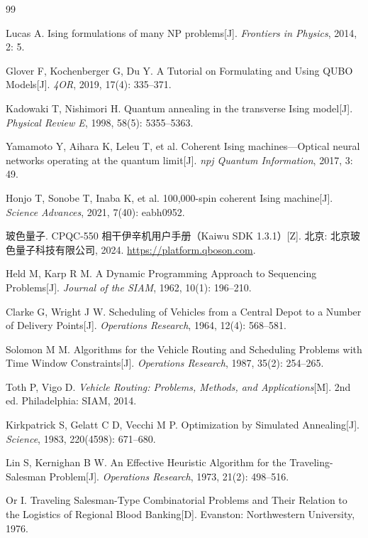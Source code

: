 \documentclass[UTF8,12pt,a4paper]{ctexart}
\begin{document}
\begin{thebibliography}{99}

Lucas A. Ising formulations of many NP problems[J]. \emph{Frontiers in Physics}, 2014, 2: 5.

Glover F, Kochenberger G, Du Y. A Tutorial on Formulating and Using QUBO Models[J]. \emph{4OR}, 2019, 17(4): 335--371.

Kadowaki T, Nishimori H. Quantum annealing in the transverse Ising model[J]. \emph{Physical Review E}, 1998, 58(5): 5355--5363.

Yamamoto Y, Aihara K, Leleu T, et al. Coherent Ising machines---Optical neural networks operating at the quantum limit[J]. \emph{npj Quantum Information}, 2017, 3: 49.

Honjo T, Sonobe T, Inaba K, et al. 100,000-spin coherent Ising machine[J]. \emph{Science Advances}, 2021, 7(40): eabh0952.

玻色量子. CPQC-550 相干伊辛机用户手册（Kaiwu SDK 1.3.1）[Z]. 北京: 北京玻色量子科技有限公司, 2024. \url{https://platform.qboson.com}.

Held M, Karp R M. A Dynamic Programming Approach to Sequencing Problems[J]. \emph{Journal of the SIAM}, 1962, 10(1): 196--210.

Clarke G, Wright J W. Scheduling of Vehicles from a Central Depot to a Number of Delivery Points[J]. \emph{Operations Research}, 1964, 12(4): 568--581.

Solomon M M. Algorithms for the Vehicle Routing and Scheduling Problems with Time Window Constraints[J]. \emph{Operations Research}, 1987, 35(2): 254--265.

Toth P, Vigo D. \emph{Vehicle Routing: Problems, Methods, and Applications}[M]. 2nd ed. Philadelphia: SIAM, 2014.

Kirkpatrick S, Gelatt C D, Vecchi M P. Optimization by Simulated Annealing[J]. \emph{Science}, 1983, 220(4598): 671--680.

Lin S, Kernighan B W. An Effective Heuristic Algorithm for the Traveling-Salesman Problem[J]. \emph{Operations Research}, 1973, 21(2): 498--516.

Or I. Traveling Salesman-Type Combinatorial Problems and Their Relation to the Logistics of Regional Blood Banking[D]. Evanston: Northwestern University, 1976.


\end{thebibliography}
\end{document}
